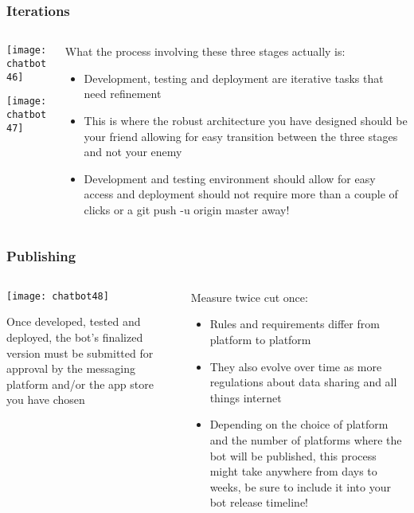 \begin{frame}[fragile]\frametitle{Iterations}
    \begin{columns}
    \begin{column}[t]{0.5\linewidth}
\begin{center}
\texttt{[image: chatbot46]}

\texttt{[image: chatbot47]}

\end{center}
\end{column}
    \begin{column}[t]{0.5\linewidth}
What the process involving these three stages actually is:

\begin{itemize}
\item Development, testing and deployment are iterative tasks that need refinement
\item This is where the robust architecture you have designed should be your friend allowing for easy transition between the three stages and not your enemy
\item Development and testing environment should allow for easy access and deployment should not require more than a couple of clicks or a git push -u origin master away!
\end{itemize}
\end{column}
\end{columns}
\end{frame}

\begin{frame}[fragile]\frametitle{Publishing}
    \begin{columns}
    \begin{column}[t]{0.5\linewidth}
\begin{center}
\texttt{[image: chatbot48]}
\end{center}

Once developed, tested and deployed, the bot's finalized version must be submitted for approval by the messaging platform and/or the app store you have chosen

\end{column}
    \begin{column}[t]{0.5\linewidth}
Measure twice cut once:

\begin{itemize}
\item Rules and requirements differ from platform to platform
\item They also evolve over time as more regulations about data sharing and all things internet
\item Depending on the choice of platform and the number of platforms where the bot will be published, this process might take anywhere from days to weeks, be sure to include it into your bot release timeline!
\end{itemize}
\end{column}
\end{columns}
\end{frame}

